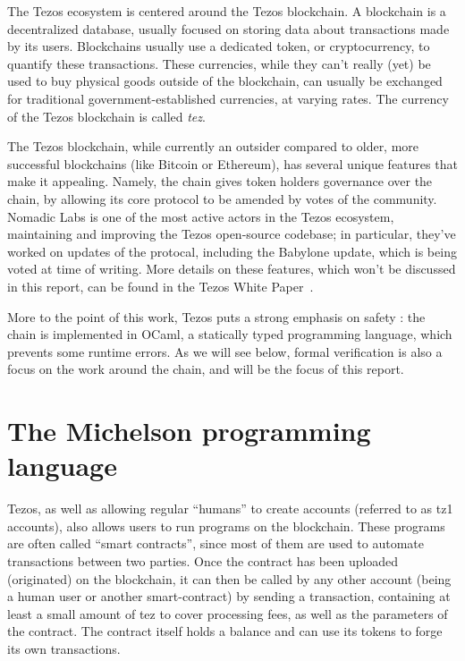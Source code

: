 \documentclass{report}
\begin{document}
The Tezos ecosystem is centered around the Tezos blockchain. A blockchain is a decentralized database, usually focused on storing data about transactions made by its users. Blockchains usually use a dedicated token, or cryptocurrency, to quantify these transactions. These currencies, while they can't really (yet) be used to buy physical goods outside of the blockchain, can usually be exchanged for traditional government-established currencies, at varying rates. The currency of the Tezos blockchain is called \emph{tez}.

The Tezos blockchain, while currently an outsider compared to older, more successful blockchains (like Bitcoin or Ethereum), has several unique features that make it appealing. Namely, the chain gives token holders governance over the chain, by allowing its core protocol to be amended by votes of the community. Nomadic Labs is one of the most active actors in the Tezos ecosystem, maintaining and improving the Tezos open-source codebase; in particular, they've worked on updates of the protocal, including the Babylone update, which is being voted at time of writing. More details on these features, which won't be discussed in this report, can be found in the Tezos White Paper~\cite{whitePaper}.

More to the point of this work, Tezos puts a strong emphasis on safety : the chain is implemented in OCaml, a statically typed programming language, which prevents some runtime errors. As we will see below, formal verification is also a focus on the work around the chain, and will be the focus of this report.

\section{The Michelson programming language}

Tezos, as well as allowing regular ``humans'' to create accounts (referred to as tz1 accounts), also allows users to run programs on the blockchain. These programs are often called ``smart contracts'', since most of them are used to automate transactions between two parties. Once the contract has been uploaded (originated) on the blockchain, it can then be called by any other account (being a human user or another smart-contract) by sending a transaction, containing at least a small amount of tez to cover processing fees, as well as the parameters of the contract. The contract itself holds a balance and can use its tokens to forge its own transactions.
\end{document}
